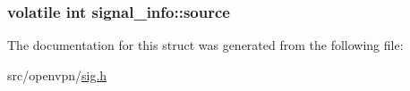 \subsubsection[{source}]{\setlength{\rightskip}{0pt plus 5cm}volatile int signal\+\_\+info\+::source}\label{structsignal__info_aff345ec3f6a0b37155a2561e9ff7f0b5}


The documentation for this struct was generated from the following file\+:\begin{DoxyCompactItemize}
\item 
src/openvpn/\hyperlink{sig_8h}{sig.\+h}\end{DoxyCompactItemize}
